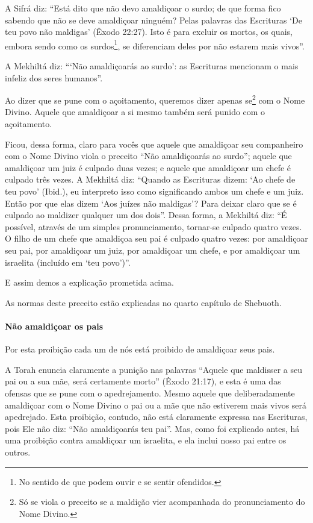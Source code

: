 A Sifrá diz: ``Está dito que não devo amaldiçoar o surdo; de que forma
fico sabendo que não se deve amaldiçoar ninguém? Pelas palavras das
Escrituras `De teu povo não maldigas' (Êxodo 22:27). Isto é para
excluir os mortos, os quais, embora sendo como os
surdos\footnote{No sentido de que podem ouvir e se sentir ofendidos.}, se diferenciam deles por não estarem mais
vivos''.

A Mekhiltá diz: ```Não amaldiçoarás ao surdo': as Escrituras mencionam
o mais infeliz dos seres humanos''.

Ao dizer que se pune com o açoitamento, queremos dizer apenas se\footnote{Só se viola o preceito se a maldição vier acompanhada do
pronunciamento do Nome Divino.} com o Nome Divino. Aquele que amaldiçoar a si
mesmo também será punido com o açoitamento.

Ficou, dessa forma, claro para vocês que aquele que amaldiçoar seu
companheiro com o Nome Divino viola o preceito ``Não amaldiçoarás ao
surdo''; aquele que amaldiçoar um juiz é culpado duas vezes; e aquele
que amaldiçoar um chefe é culpado três vezes. A Mekhiltá diz: ``Quando
as Escrituras dizem: `Ao chefe de teu povo' (Ibid.), eu interpreto isso
como significando ambos um chefe e um juiz. Então por que elas dizem
`Aos juízes não maldigas'? Para deixar claro que se é culpado ao
maldizer qualquer um dos dois''. Dessa forma, a Mekhiltá diz: ``É
possível, através de um simples pronunciamento, tornar-se culpado
quatro vezes. O filho de um chefe que amaldiçoa seu pai é culpado quatro
vezes: por amaldiçoar seu pai, por amaldiçoar um juiz, por amaldiçoar um
chefe, e por amaldiçoar um israelita (incluído em `teu povo')''.

E assim demos a explicação prometida acima.

As normas deste preceito estão explicadas no quarto capítulo de Shebuoth.

\paragraph{Não amaldiçoar os pais}

Por esta proibição cada um de nós está proibido de amaldiçoar seus pais.

A Torah enuncia claramente a punição nas palavras ``Aquele que maldisser
a seu pai ou a sua mãe, será certamente morto'' (Êxodo 21:17), e esta é
uma das ofensas que se pune com o apedrejamento. Mesmo aquele que
deliberadamente amaldiçoar com o Nome Divino o pai ou a mãe que não
estiverem mais vivos será apedrejado. Esta proibição, contudo, não está
claramente expressa nas Escrituras, pois Ele não diz: ``Não amaldiçoarás
teu pai''. Mas, como foi explicado antes, há uma proibição contra
amaldiçoar um israelita, e ela inclui nosso pai entre os outros.


